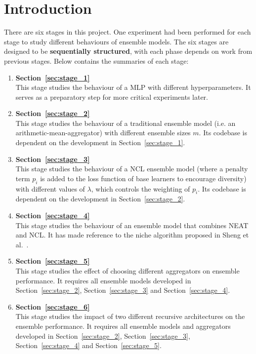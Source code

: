 \documentclass{article}
\begin{document}
\section{Introduction}
There are six stages in this project. One experiment had been performed for each stage to study different behaviours of ensemble models. The six stages are designed to be \textbf{sequentially structured}, with each phase depends on work from previous stages. Below contains the summaries of each stage: 

\begin{enumerate}
    \item \textbf{Section~\ref{sec:stage_1}} \\
    This stage studies the behaviour of a MLP with different hyperparameters. It serves as a preparatory step for more critical experiments later. 

    \item \textbf{Section~\ref{sec:stage_2}} \\
    This stage studies the behaviour of a traditional ensemble model (i.e. an arithmetic-mean-aggregator) with different ensemble sizes $m$. Its codebase is dependent on the development in Section~\ref{sec:stage_1}. 

    \item \textbf{Section~\ref{sec:stage_3}} \\
    This stage studies the behaviour of a NCL ensemble model (where a penalty term $p_i$ is added to the loss function of base learners to encourage diversity) with different values of $\lambda$, which controls the weighting of $p_i$. Its codebase is dependent on the development in Section~\ref{sec:stage_2}. 

    \item \textbf{Section~\ref{sec:stage_4}} \\
    This stage studies the behaviour of an ensemble model that combines NEAT and NCL. It has made reference to the niche algorithm proposed in Sheng et al.\ \cite{sheng2017niching}. 

    \item \textbf{Section~\ref{sec:stage_5}} \\
    This stage studies the effect of choosing different aggregators on ensemble performance. It requires all ensemble models developed in Section~\ref{sec:stage_2}, Section~\ref{sec:stage_3} and Section~\ref{sec:stage_4}. 

    \item \textbf{Section~\ref{sec:stage_6}} \\
    This stage studies the impact of two different recursive architectures on the ensemble performance. It requires all ensemble models and aggregators developed in Section~\ref{sec:stage_2}, Section~\ref{sec:stage_3}, Section~\ref{sec:stage_4} and Section~\ref{sec:stage_5}. 
\end{enumerate}
\end{document}
